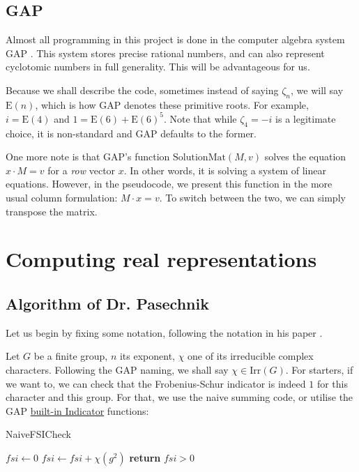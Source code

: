 \documentclass[11pt]{article}
\begin{document}
\subsection{GAP}

Almost all programming in this project is done in the computer algebra system GAP
\cite{GAP4}. This system stores precise rational numbers, and can also represent
cyclotomic numbers in full generality. This will be advantageous for us.

Because we shall describe the code, sometimes instead of saying $\zeta_n$, we
will say $\text{E}(n)$, which is how GAP denotes these primitive roots. For
example, $i = \text{E}(4)$ and $1 = \text{E}(6) + \text{E}(6)^5$. Note that while
$\zeta_4 = -i$ is a legitimate choice, it is non-standard and GAP defaults
to the former.

One more note is that GAP's function $\text{SolutionMat}(M, v)$ solves the equation
$x \cdot M = v$ for a \textit{row} vector $x$. In other words, it is solving a system
of linear equations. However, in the pseudocode, we present this function in the
more usual column formulation: $M \cdot x = v$. To switch between
the two, we can simply transpose the matrix.

\newpage

\section{Computing real representations}

\subsection{Algorithm of Dr. Pasechnik} \label{sec:alg}

Let us begin by fixing some notation, following the notation in his paper \cite{Pas21}.

Let $G$ be a finite group, $n$ its exponent, $\chi$ one of its irreducible complex characters. 
Following the GAP naming, we shall say $\chi \in \text{Irr}(G)$. For starters, if we want to,
we can check that the Frobenius-Schur indicator is indeed $1$ for this character and this group.
For that, we use the naive summing code, or utilise the GAP
\href{https://docs.gap-system.org/doc/ref/chap71_mj.html#X7FD3D3047DE6381E}{built-in Indicator} functions:

\begin{algorithm}
  \caption{NaiveFSICheck}
  \begin{algorithmic}
    \State $fsi \gets 0$
      \State $fsi \gets fsi + \chi(g^2)$
    \EndFor
    \State \textbf{return} $fsi > 0$
  \end{algorithmic}
\end{algorithm}
\end{document}
